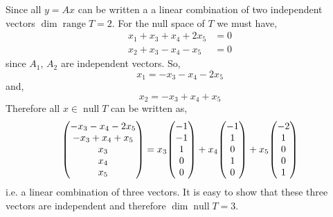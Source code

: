 \documentclass[11pt,a4paper]{scrartcl}
\DeclareMathOperator{\range}{range}
\DeclareMathOperator{\nspace}{null}
\newcounter{problem}
\begin{document}
\begin{problem}[3.B.1]
{        Since all $y=Ax$ can be written a a linear combination of two
        independent vectors $\dim \range T=2$. For the null space of $T$
        we must have,
        \begin{align*}
            x_1+x_3+x_4+2x_5 &=0 \\
            x_2+x_3-x_4-x_5 & =0
        \end{align*}
        since $A_1$, $A_2$ are independent vectors. So,
        \[
            x_1=-x_3-x_4-2x_5
        \]
        and,
        \[
            x_2=-x_3+x_4+x_5
        \]
        Therefore all $x \in \nspace T$ can be written as,
        \[
        \mqty(
            -x_3-x_4-2x_5 \\ -x_3+x_4+x_5 \\ x_3 \\ x_4 \\ x_5
        )    
        =
        x_3 \mqty(
            -1 \\ -1 \\ 1 \\ 0 \\ 0
        )   
        +
        x_4 \mqty(
            -1 \\ 1 \\ 0 \\ 1 \\ 0
        )  
        +
        x_5 \mqty(
            -2 \\ 1 \\ 0 \\ 0 \\ 1
        )  
        \]
        i.e. a linear combination of three vectors. It is easy to show that
        these three vectors are independent and therefore $\dim \nspace T=3$.
    }
\end{problem}
\end{document}
